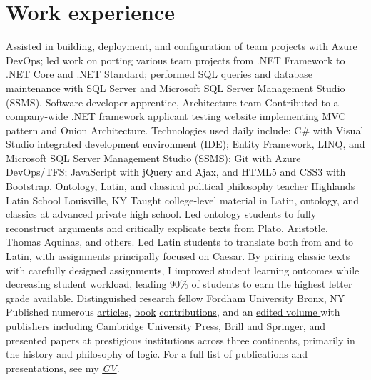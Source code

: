 \section{Work experience}
{Assisted in building, deployment, and configuration of team projects with Azure DevOps;
	led work on porting various team projects from .NET Framework to .NET Core and .NET Standard; performed SQL queries and database maintenance with SQL Server and Microsoft SQL Server Management Studio (SSMS).
}
{Software developer apprentice, Architecture team}
{}
{}
{}
{Contributed to a company-wide .NET framework applicant testing website implementing MVC pattern and Onion Architecture. 
	Technologies used daily include: 
	C\# with Visual Studio integrated development environment (IDE); 
	Entity Framework, LINQ, and Microsoft SQL Server Management Studio (SSMS); 
	Git with Azure DevOps/TFS;  
	JavaScript with jQuery and Ajax, 
	and HTML5 and CSS3 with Bootstrap. 
	}
{Ontology, Latin, and classical political philosophy teacher}
{Highlands Latin School}
{Louisville, KY}
{}
{Taught college-level material in Latin, ontology, and classics at advanced private high school. 
	Led ontology students to fully reconstruct arguments 
	and critically explicate texts from Plato, Aristotle, Thomas Aquinas, and others. 
	Led Latin students to translate both from and to Latin, 
	with assignments principally focused on Caesar. 
	By pairing classic texts with carefully designed assignments, 
	I improved student learning outcomes 
	while decreasing student workload, 
	leading 90\% of students to earn the highest letter grade available.}
{Distinguished research fellow}
{Fordham University}
{Bronx, NY}
{}
{Published numerous \href{https://fordham.academia.edu/jacobarchambault}{articles}, \href{https://www.collegepublications.co.uk/dialogues/?00005}{book} \href{https://www.cambridgescholars.com/hylomorphism-and-mereology}{contributions}, and an \href{https://brill.com/view/journals/viv/56/3-4/viv.56.issue-3-4.xml?language=en}{edited volume }
	with publishers including Cambridge University Press, Brill and Springer, 
	and presented papers at prestigious institutions across three continents, 
	primarily in the history and philosophy of logic. 
	For a full list of publications and presentations, see my 
	\href{https://jacobarchambault.com/curriculum-vitae}{\emph{CV}}.}
